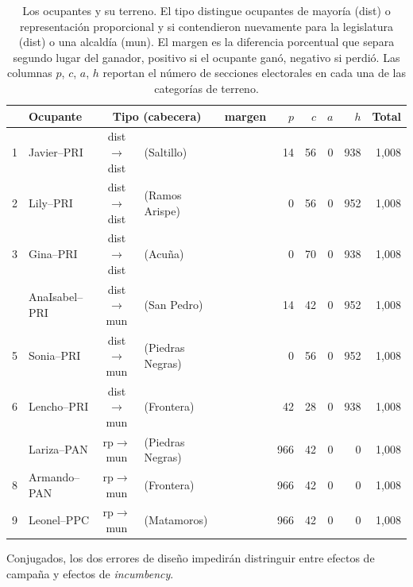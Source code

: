 \documentclass[letter,12pt]{article}
\newcommand{\mc}{\multicolumn}
\begin{document}
\begin{table}
  \centering
  \begin{tabular}{clclcrrrrr}
      & Ocupante        & \mc{2}{c}{Tipo (cabecera)}              & margen               & $p$ & $c$ & $a$ & $h$ & Total \\ \hline
    1 & Javier--PRI    & dist$\rightarrow$dist & (Saltillo)       &   \color{red}{$-12$} &  14 &  56 &  0  & 938 & 1,008 \\
    2 & Lily--PRI      & dist$\rightarrow$dist & (Ramos Arispe)   & \color{green}{$+14$} &   0 &  56 &  0  & 952 & 1,008 \\
    3 & Gina--PRI      & dist$\rightarrow$dist & (Acuña)          &   \color{red}{$-17$} &   0 &  70 &  0  & 938 & 1,008 \\ \hdashline
    4 & AnaIsabel--PRI & dist$\rightarrow$mun  & (San Pedro)      &  \color{green}{$+3$} &  14 &  42 &  0  & 952 & 1,008 \\
    5 & Sonia--PRI     & dist$\rightarrow$mun  & (Piedras Negras) & \color{green}{$+12$} &   0 &  56 &  0  & 952 & 1,008 \\
    6 & Lencho--PRI    & dist$\rightarrow$mun  & (Frontera)       &  \color{green}{$+8$} &  42 &  28 &  0  & 938 & 1,008 \\ \hdashline
    7 & Lariza--PAN    & rp$\rightarrow$mun    & (Piedras Negras) &   \color{red}{$-12$} & 966 &  42 &  0  &   0 & 1,008 \\
    8 & Armando--PAN   & rp$\rightarrow$mun    & (Frontera)       &    \color{red}{$-8$} & 966 &  42 &  0  &   0 & 1,008 \\
    9 & Leonel--PPC    & rp$\rightarrow$mun    & (Matamoros)      &    \color{red}{$-7$} & 966 &  42 &  0  &   0 & 1,008 \\ \hline
  \end{tabular}
  \caption{Los ocupantes y su terreno. El tipo distingue ocupantes de mayoría (dist) o representación proporcional y si contendieron nuevamente para la legislatura (dist) o una alcaldía (mun). El margen es la diferencia porcentual que separa segundo lugar del ganador, positivo si el ocupante ganó, negativo si perdió. Las columnas $p$, $c$, $a$, $h$ reportan el número de secciones electorales en cada una de las categorías de terreno.}\label{T:terrenos}
\end{table}

Conjugados, los dos errores de diseño impedirán distringuir entre efectos de campaña y efectos de \emph{incumbency}. 
\end{document}
